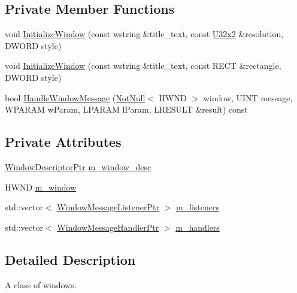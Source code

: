 \subsection*{Private Member Functions}
\begin{DoxyCompactItemize}
\item 
void \mbox{\hyperlink{classmage_1_1_window_a88a4c3dceff2ef728befa5d5a11ef76c}{Initialize\+Window}} (const wstring \&title\+\_\+text, const \mbox{\hyperlink{namespacemage_a31f2bb52b5080e706e1c13de07c0a249}{U32x2}} \&resolution, D\+W\+O\+RD style)
\item 
void \mbox{\hyperlink{classmage_1_1_window_a1b2face21d9235cbf298e4e6e34186b7}{Initialize\+Window}} (const wstring \&title\+\_\+text, const R\+E\+CT \&rectangle, D\+W\+O\+RD style)
\item 
bool \mbox{\hyperlink{classmage_1_1_window_a4f658dd2b4be552e2b226b7b8f3c2ccd}{Handle\+Window\+Message}} (\mbox{\hyperlink{namespacemage_a8769f9d670d6b585ea306cb1062af94b}{Not\+Null}}$<$ H\+W\+ND $>$ window, U\+I\+NT message, W\+P\+A\+R\+AM w\+Param, L\+P\+A\+R\+AM l\+Param, L\+R\+E\+S\+U\+LT \&result) const
\end{DoxyCompactItemize}
\subsection*{Private Attributes}
\begin{DoxyCompactItemize}
\item 
\mbox{\hyperlink{classmage_1_1_window_ac41b052d8e8dd0571b3ec862e8f6da05}{Window\+Descriptor\+Ptr}} \mbox{\hyperlink{classmage_1_1_window_a51bbea46f4590a68d384d0b8d14e0cd8}{m\+\_\+window\+\_\+desc}}
\item 
H\+W\+ND \mbox{\hyperlink{classmage_1_1_window_a5ca72a18801ff9e6abc309949d7b08b4}{m\+\_\+window}}
\item 
std\+::vector$<$ \mbox{\hyperlink{classmage_1_1_window_a0e0a4f2a3f6db176f6aec454b94a06fb}{Window\+Message\+Listener\+Ptr}} $>$ \mbox{\hyperlink{classmage_1_1_window_a28aab68439dc39058a7e507b0cd8c60b}{m\+\_\+listeners}}
\item 
std\+::vector$<$ \mbox{\hyperlink{classmage_1_1_window_add1d792fb9f71e70d4fb07409d80cfdd}{Window\+Message\+Handler\+Ptr}} $>$ \mbox{\hyperlink{classmage_1_1_window_a7438964a7b8c196d84da24cf789e5bd9}{m\+\_\+handlers}}
\end{DoxyCompactItemize}


\subsection{Detailed Description}
A class of windows. 

